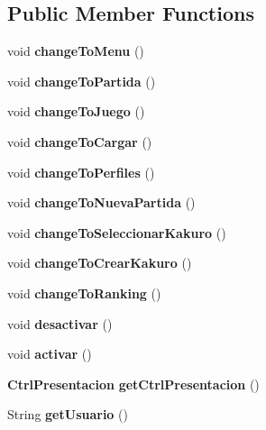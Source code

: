\subsection*{Public Member Functions}
\begin{DoxyCompactItemize}
\item 
\mbox{\label{class_presentacion_1_1_vista_principal_a8d40e08d072012a7d130ceba47e34f50}} 
void {\bfseries change\+To\+Menu} ()
\item 
\mbox{\label{class_presentacion_1_1_vista_principal_ab394ef525ce8cb59259741fbdd89e787}} 
void {\bfseries change\+To\+Partida} ()
\item 
\mbox{\label{class_presentacion_1_1_vista_principal_a860073866cf68025051d2ddea38ec65e}} 
void {\bfseries change\+To\+Juego} ()
\item 
\mbox{\label{class_presentacion_1_1_vista_principal_ad099c0dbb4e84ea7dc48ac333d20ba52}} 
void {\bfseries change\+To\+Cargar} ()
\item 
\mbox{\label{class_presentacion_1_1_vista_principal_a2b9b84bfac2083a7263563e881a38320}} 
void {\bfseries change\+To\+Perfiles} ()
\item 
\mbox{\label{class_presentacion_1_1_vista_principal_a2dbbdd75f198b2e31506e45847f67ff2}} 
void {\bfseries change\+To\+Nueva\+Partida} ()
\item 
\mbox{\label{class_presentacion_1_1_vista_principal_ae368d68edbcc9518c455b7e73e20d81f}} 
void {\bfseries change\+To\+Seleccionar\+Kakuro} ()
\item 
\mbox{\label{class_presentacion_1_1_vista_principal_ab7a5923c6306eb7938e8db1c1bd85644}} 
void {\bfseries change\+To\+Crear\+Kakuro} ()
\item 
\mbox{\label{class_presentacion_1_1_vista_principal_a9e4e0c42aef188b4d526a0ca01e373a5}} 
void {\bfseries change\+To\+Ranking} ()
\item 
\mbox{\label{class_presentacion_1_1_vista_principal_ad039a1881f9a01b0d6ba547505b4ceb4}} 
void {\bfseries desactivar} ()
\item 
\mbox{\label{class_presentacion_1_1_vista_principal_add12112d8694e477589f03ebebc3ff67}} 
void {\bfseries activar} ()
\item 
\mbox{\label{class_presentacion_1_1_vista_principal_ae147a1faf581c3727242c494a29c27b3}} 
\textbf{ Ctrl\+Presentacion} {\bfseries get\+Ctrl\+Presentacion} ()
\item 
\mbox{\label{class_presentacion_1_1_vista_principal_aa2ce56241163b9f202ac684743d12e9b}} 
String {\bfseries get\+Usuario} ()
\item 

\end{DoxyCompactItemize}
